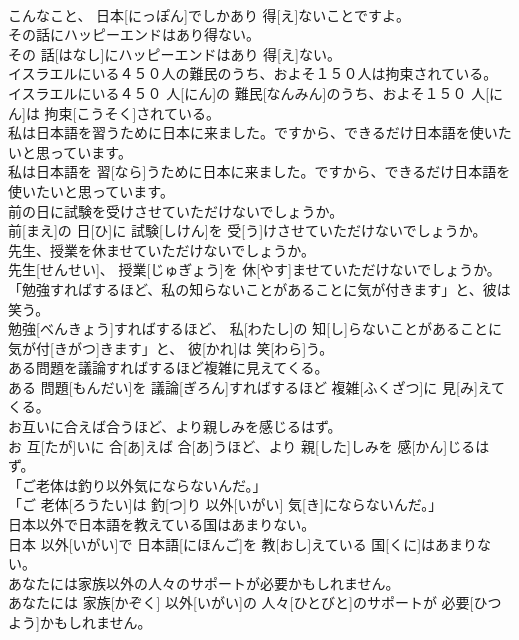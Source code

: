 \documentclass[8pt]{extreport}
\begin{document}
\begin{CJK}{UTF8}{min}
\\	こんなこと、 日本[にっぽん]でしかあり 得[え]ないことですよ。	
\\	その話にハッピーエンドはあり得ない。	
\\	その 話[はなし]にハッピーエンドはあり 得[え]ない。	
\\	イスラエルにいる４５０人の難民のうち、およそ１５０人は拘束されている。	
\\	イスラエルにいる４５０ 人[にん]の 難民[なんみん]のうち、およそ１５０ 人[にん]は 拘束[こうそく]されている。	
\\	私は日本語を習うために日本に来ました。ですから、できるだけ日本語を使いたいと思っています。	
\\	私は日本語を 習[なら]うために日本に来ました。ですから、できるだけ日本語を使いたいと思っています。	
\\	前の日に試験を受けさせていただけないでしょうか。	
\\	前[まえ]の 日[ひ]に 試験[しけん]を 受[う]けさせていただけないでしょうか。	
\\	先生、授業を休ませていただけないでしょうか。	
\\	先生[せんせい]、 授業[じゅぎょう]を 休[やす]ませていただけないでしょうか。	
\\	「勉強すればするほど、私の知らないことがあることに気が付きます」と、彼は笑う。	
\\	勉強[べんきょう]すればするほど、 私[わたし]の 知[し]らないことがあることに 気が付[きがつ]きます」と、 彼[かれ]は 笑[わら]う。	
\\	ある問題を議論すればするほど複雑に見えてくる。	
\\	ある 問題[もんだい]を 議論[ぎろん]すればするほど 複雑[ふくざつ]に 見[み]えてくる。	
\\	お互いに合えば合うほど、より親しみを感じるはず。	
\\	お 互[たが]いに 合[あ]えば 合[あ]うほど、より 親[した]しみを 感[かん]じるはず。	
\\	「ご老体は釣り以外気にならないんだ。」	
\\	「ご 老体[ろうたい]は 釣[つ]り 以外[いがい] 気[き]にならないんだ。」	
\\	日本以外で日本語を教えている国はあまりない。	
\\	日本 以外[いがい]で 日本語[にほんご]を 教[おし]えている 国[くに]はあまりない。	
\\	あなたには家族以外の人々のサポートが必要かもしれません。	
\\	あなたには 家族[かぞく] 以外[いがい]の 人々[ひとびと]のサポートが 必要[ひつよう]かもしれません。	

\end{CJK}
\end{document}
